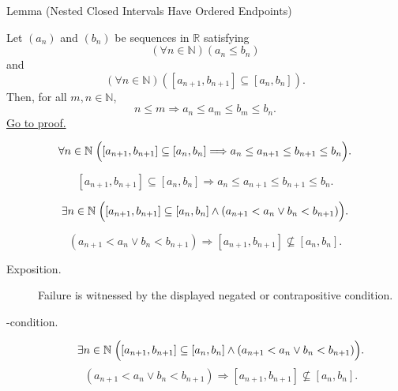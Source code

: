 
\begin{lemmabox}{Lemma (Nested Closed Intervals Have Ordered Endpoints)}
\begin{lemma}
\label{lem:nested-closed-intervals-have-ordered-endpoints}
Let $(a_n)$ and $(b_n)$ be sequences in $\mathbb{R}$ satisfying
\[
  (\forall n\in\mathbb{N})(a_n\leq b_n)
\]
and
\[
  (\forall n\in\mathbb{N})([a_{n+1},b_{n+1}]\subseteq [a_n,b_n]).
\]
Then, for all $m,n\in\mathbb{N}$,
\[
  n\leq m
  \Longrightarrow
  a_n\leq a_m\leq b_m\leq b_n.
\]
\hyperref[prf:nested-closed-intervals-have-ordered-endpoints]{Go to proof.}
\end{lemma}
\end{lemmabox}

\begin{remark*}
\[
\forall n\in\mathbb{N}\;
\Bigl([a_{n+1},b_{n+1}]\subseteq [a_n,b_n]
\Longrightarrow
a_n\le a_{n+1}\le b_{n+1}\le b_n\Bigr).
\]
\end{remark*}

\begin{remark*}
\[
[a_{n+1},b_{n+1}]\subseteq [a_n,b_n]
\Longrightarrow
a_n\le a_{n+1}\le b_{n+1}\le b_n.
\]
\end{remark*}

\begin{remark*}
\[
\exists n\in\mathbb{N}\;
\Bigl([a_{n+1},b_{n+1}]\subseteq [a_n,b_n]\land
(a_{n+1}<a_n\lor b_n<b_{n+1})\Bigr).
\]
\end{remark*}

\begin{remark*}
\[
(a_{n+1}<a_n\lor b_n<b_{n+1})
\Longrightarrow
[a_{n+1},b_{n+1}]\not\subseteq [a_n,b_n].
\]
\end{remark*}

\begin{remark*}
\begin{description}
  \item[Exposition.]
  Failure is witnessed by the displayed negated or contrapositive condition.

  \item[\exists-condition.]
  \[
\exists n\in\mathbb{N}\;
\Bigl([a_{n+1},b_{n+1}]\subseteq [a_n,b_n]\land
(a_{n+1}<a_n\lor b_n<b_{n+1})\Bigr).
\]
\[
(a_{n+1}<a_n\lor b_n<b_{n+1})
\Longrightarrow
[a_{n+1},b_{n+1}]\not\subseteq [a_n,b_n].
\]
\end{description}
\end{remark*}

